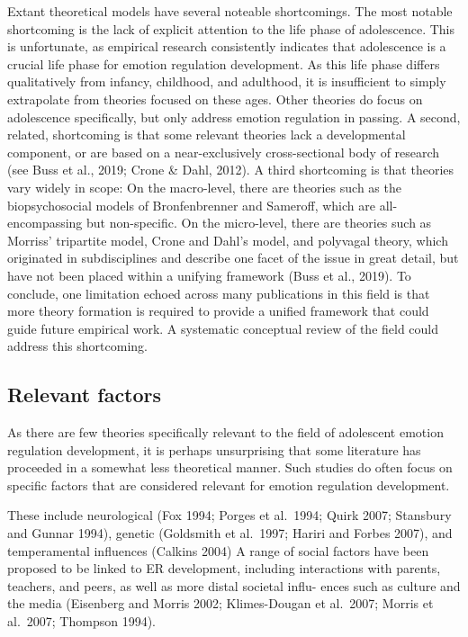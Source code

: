 \documentclass[
  english,
  man]{apa6}
\begin{document}
Extant theoretical models have several noteable shortcomings. The most notable shortcoming is the lack of explicit attention to the life phase of adolescence. This is unfortunate, as empirical research consistently indicates that adolescence is a crucial life phase for emotion regulation development. As this life phase differs qualitatively from infancy, childhood, and adulthood, it is insufficient to simply extrapolate from theories focused on these ages. Other theories do focus on adolescence specifically, but only address emotion regulation in passing. A second, related, shortcoming is that some relevant theories lack a developmental component, or are based on a near-exclusively cross-sectional body of research (see Buss et al., 2019; Crone \& Dahl, 2012). A third shortcoming is that theories vary widely in scope: On the macro-level, there are theories such as the biopsychosocial models of Bronfenbrenner and Sameroff, which are all-encompassing but non-specific. On the micro-level, there are theories such as Morriss' tripartite model, Crone and Dahl's model, and polyvagal theory, which originated in subdisciplines and describe one facet of the issue in great detail, but have not been placed within a unifying framework (Buss et al., 2019). To conclude, one limitation echoed across many publications in this field is that more theory formation is required to provide a unified framework that could guide future empirical work. A systematic conceptual review of the field could address this shortcoming.

\hypertarget{relevant-factors}{%
\subsection{Relevant factors}\label{relevant-factors}}

As there are few theories specifically relevant to the field of adolescent emotion regulation development, it is perhaps unsurprising that some literature has proceeded in a somewhat less theoretical manner. Such studies do often focus on specific factors that are considered relevant for emotion regulation development.

These include neurological (Fox 1994;
Porges et al.~1994; Quirk 2007; Stansbury and Gunnar
1994), genetic (Goldsmith et al.~1997; Hariri and Forbes
2007), and temperamental inﬂuences (Calkins 2004)
A range of social factors have been proposed to be linked to
ER development, including interactions with parents,
teachers, and peers, as well as more distal societal inﬂu-
ences such as culture and the media (Eisenberg and Morris
2002; Klimes-Dougan et al.~2007; Morris et al.~2007;
Thompson 1994).
\end{document}
